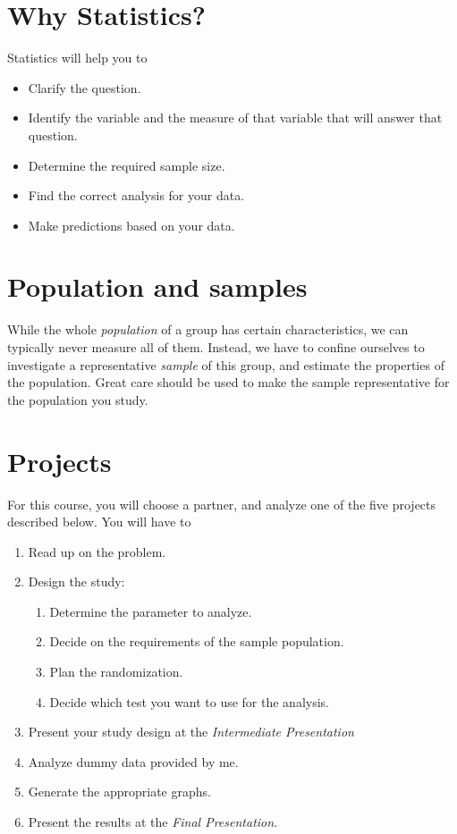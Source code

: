 \section{Why Statistics?}

Statistics will help you to
\begin{itemize}
  \item Clarify the question.
  \item Identify the variable and the measure of that variable that will answer that question.
  \item Determine the required sample size.
  \item Find the correct analysis for your data.
  \item Make predictions based on your data.
\end{itemize}

\section{Population and samples}

While the whole \emph{population} of a group has certain characteristics,
we can typically never measure all of them. Instead, we have to confine
ourselves to investigate a representative \emph{sample} of this group, and
estimate the properties of the population. Great care should be used to make the sample
representative for the population you study.

\section{Projects}

For this course, you will choose a partner, and analyze one of the five projects described below. You will have to

\begin{enumerate}
  \item Read up on the problem.
  \item Design the study:

  \begin{enumerate}
    \item Determine the parameter to analyze.
    \item Decide on the requirements of the sample population.
    \item Plan the randomization.
    \item Decide which test you want to use for the analysis.
  \end{enumerate}

  \item Present your study design at the \emph{Intermediate Presentation}
  \item Analyze dummy data provided by me.
  \item Generate the appropriate graphs.
  \item Present the results at the \emph{Final Presentation}.
\end{enumerate}

